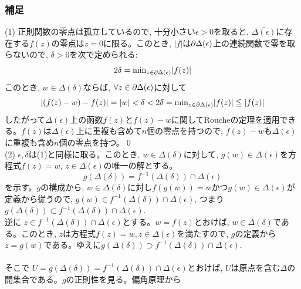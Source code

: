 \subsubsection{補足}
\prf
(1) 正則関数の零点は孤立しているので, 十分小さい$\epsilon>0$を取ると, $\bar{\Delta(\epsilon)}$に存在する$f(z)$の零点は$z=0$に限る。このとき, $|f|$は$\partial\Delta(\epsilon)$上の連続関数で零を取らないので, $\delta>0$を次で定められる:
\[2\delta =\mbox{min}_{z\in \partial\Delta(\epsilon)}|f(z)|\]
このとき, $w\in \Delta(\delta)$ならば, $\forall z\in \partial\Delta(\epsilon)$に対して
\[|(f(z)-w)-f(z)|=|w|<\delta<2\delta =\mbox{min}_{z\in\partial\Delta(\epsilon)}|f(z)|\leqq |f(z)|\]
したがって$\Delta(\epsilon)$上の函数$f(z)$と$f(z)-w$に関してRoucheの定理を適用できる。$f(z)$は$\Delta(\epsilon)$上に重複も含めて$n$個の零点を持つので, $f(z)-w$も$\Delta(\epsilon)$に重複も含め$n$個の零点を持つ。\qed\\
(2) $\epsilon, \delta$は(1)と同様に取る。このとき, $w\in \Delta(\delta)$に対して, $g(w)\in\Delta(\epsilon)$を方程式$f(z)=w$, $z\in \Delta(\epsilon)$の唯一の解とする。
\[g(\Delta(\delta))=f^{-1}(\Delta(\delta))\cap\Delta(\epsilon)\]
を示す。$g$の構成から, $w\in \Delta(\delta)$に対し$f(g(w))=w$かつ$g(w)\in\Delta(\epsilon)$が定義から従うので, $g(w)\in f^{-1}(\Delta(\delta))\cap\Delta(\epsilon)$, つまり $g(\Delta(\delta))\subset f^{-1}(\Delta(\delta))\cap \Delta(\epsilon)$.\\
逆に $z\in f^{-1}(\Delta(\delta))\cap\Delta(\epsilon)$とする。$w=f(z)$とおけば, $w\in \Delta(\delta)$である。このとき, $z$は方程式$f(z)=w, z\in \Delta(\epsilon)$を満たすので, $g$の定義から$z=g(w)$である。ゆえに$g(\Delta(\delta))\supset f^{-1}(\Delta(\delta))\cap \Delta(\epsilon)$.\\
\\
そこで $U=g(\Delta(\delta))= f^{-1}(\Delta(\delta))\cap \Delta(\epsilon)$とおけば, $U$は原点を含む$\Delta$の開集合である。$g$の正則性を見る。偏角原理から

